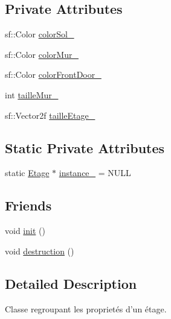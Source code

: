\subsection*{Private Attributes}
\begin{DoxyCompactItemize}
\item 
sf\-::\-Color \hyperlink{classPropriete_1_1Etage_a5021151f3c576104c8e69288c4d20acc}{color\-Sol\-\_\-}
\item 
sf\-::\-Color \hyperlink{classPropriete_1_1Etage_ae4d22f4c2da0d0283a05865e177613a5}{color\-Mur\-\_\-}
\item 
sf\-::\-Color \hyperlink{classPropriete_1_1Etage_aed705b529fa3791aee28bdfeaeab316b}{color\-Front\-Door\-\_\-}
\item 
int \hyperlink{classPropriete_1_1Etage_a110762d117446f53e2738fc93f0fba0c}{taille\-Mur\-\_\-}
\item 
sf\-::\-Vector2f \hyperlink{classPropriete_1_1Etage_ae44d4fd0e1a43d668f5614567ee6482b}{taille\-Etage\-\_\-}
\end{DoxyCompactItemize}
\subsection*{Static Private Attributes}
\begin{DoxyCompactItemize}
\item 
static \hyperlink{classPropriete_1_1Etage}{Etage} $\ast$ \hyperlink{classPropriete_1_1Etage_a18488d57f181ec2c2c01ff132ffe98fa}{instance\-\_\-} = N\-U\-L\-L
\end{DoxyCompactItemize}
\subsection*{Friends}
\begin{DoxyCompactItemize}
\item 
void \hyperlink{classPropriete_1_1Etage_a02fd73d861ef2e4aabb38c0c9ff82947}{init} ()
\item 
void \hyperlink{classPropriete_1_1Etage_a79af67d84b6605d4aa37501ecd923146}{destruction} ()
\end{DoxyCompactItemize}


\subsection{Detailed Description}
Classe regroupant les proprietés d'un étage. 

